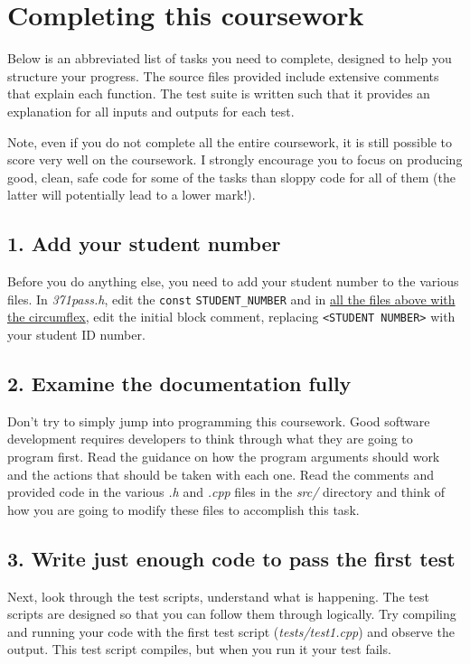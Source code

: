 \documentclass[a4paper]{article}
\begin{document}
\section*{Completing this coursework}\label{sec:tasks}

Below is an abbreviated list of tasks you need to complete, designed to help you structure your progress. The source files provided include extensive comments that explain each function. The test suite is written such that it provides an explanation for all inputs and outputs for each test.

Note, even if you do not complete all the entire coursework, it is still possible to score very well on the coursework. I strongly encourage you to focus on producing good, clean, safe code for some of the tasks than sloppy code for all of them (the latter will potentially lead to a lower mark!).


\subsection*{1. Add your student number}\label{sec:tasks student-num}
Before you do anything else, you need to add your student number to the various files. In \emph{371pass.h}, edit the \texttt{const} \texttt{STUDENT\_NUMBER} and in \hyperref[sec:cwk dir]{all the files above with the circumflex}, edit the initial block comment, replacing \texttt{<STUDENT NUMBER>} with your student ID number.



\subsection*{2. Examine the documentation fully}\label{sec:tasks documentation}
Don't try to simply jump into programming this coursework. Good software development requires developers to think through what they are going to program first. Read the guidance on how the program arguments should work and the actions that should be taken with each one. Read the comments and provided code in the various \emph{.h} and \emph{.cpp} files in the \emph{src/} directory and think of how you are going to modify these files to accomplish this task.



\subsection*{3. Write just enough code to pass the first test}\label{sec:tasks first-test}
Next, look through the test scripts, understand what is happening. The test scripts are designed so that you can follow them through logically. Try compiling and running your code with the first test script (\emph{tests/test1.cpp}) and observe the output. This test script compiles, but when you run it your test fails.
\end{document}
